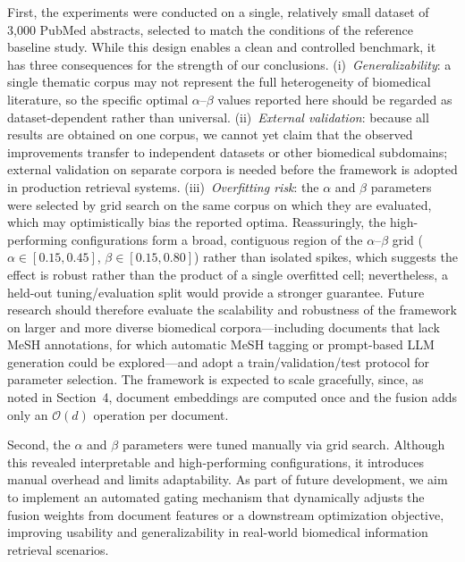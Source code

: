 \documentclass[authorproof,JACIII,researchpaper]{fujipressarticle}
\begin{document}
{\color{red}%
First, the experiments were conducted on a single, relatively small dataset of 3{,}000 PubMed abstracts, selected to match the conditions of the reference baseline study. While this design enables a clean and controlled benchmark, it has three consequences for the strength of our conclusions. (i)~\textit{Generalizability}: a single thematic corpus may not represent the full heterogeneity of biomedical literature, so the specific optimal $\alpha$--$\beta$ values reported here should be regarded as dataset-dependent rather than universal. (ii)~\textit{External validation}: because all results are obtained on one corpus, we cannot yet claim that the observed improvements transfer to independent datasets or other biomedical subdomains; external validation on separate corpora is needed before the framework is adopted in production retrieval systems. (iii)~\textit{Overfitting risk}: the $\alpha$ and $\beta$ parameters were selected by grid search on the same corpus on which they are evaluated, which may optimistically bias the reported optima. Reassuringly, the high-performing configurations form a broad, contiguous region of the $\alpha$--$\beta$ grid ($\alpha \in [0.15, 0.45]$, $\beta \in [0.15, 0.80]$) rather than isolated spikes, which suggests the effect is robust rather than the product of a single overfitted cell; nevertheless, a held-out tuning/evaluation split would provide a stronger guarantee. Future research should therefore evaluate the scalability and robustness of the framework on larger and more diverse biomedical corpora---including documents that lack MeSH annotations, for which automatic MeSH tagging or prompt-based LLM generation could be explored---and adopt a train/validation/test protocol for parameter selection. The framework is expected to scale gracefully, since, as noted in Section~4, document embeddings are computed once and the fusion adds only an $\mathcal{O}(d)$ operation per document.
}%

{\color{red}%
Second, the $\alpha$ and $\beta$ parameters were tuned manually via grid search. Although this revealed interpretable and high-performing configurations, it introduces manual overhead and limits adaptability. As part of future development, we aim to implement an automated gating mechanism that dynamically adjusts the fusion weights from document features or a downstream optimization objective, improving usability and generalizability in real-world biomedical information retrieval scenarios.
}%
\end{document}
